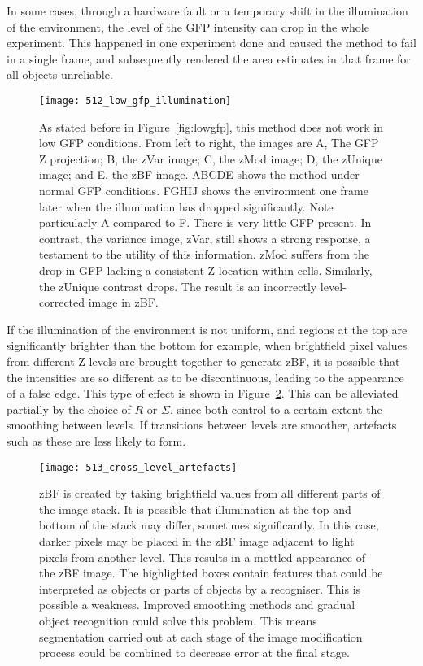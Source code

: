 In some cases, through a hardware fault or a temporary shift in the illumination of the environment, the level of the GFP intensity can drop in the whole experiment. This happened in one experiment done and caused the method to fail in a single frame, and subsequently rendered the area estimates in that frame for all objects unreliable.

\begin{figure}[h!]
 \centering
 \texttt{[image: 512\_low\_gfp\_illumination]}
 \caption[Effects of low GFP illumination]{
 	As stated before in Figure~\ref{fig:lowgfp}, this method does not work in low GFP conditions. From left to right, the images are A, The GFP Z projection; B, the zVar image; C, the zMod image; D, the zUnique image; and E, the zBF image. ABCDE shows the method under normal GFP conditions. FGHIJ shows the environment one frame later when the illumination has dropped significantly. Note particularly A compared to F. There is very little GFP present. In contrast, the variance image, zVar, still shows a strong response, a testament to the utility of this information. zMod suffers from the drop in GFP lacking a consistent Z location within cells. Similarly, the zUnique contrast drops. The result is an incorrectly level-corrected image in zBF.
 }
 \label{fig:lowgfpillumination}
\end{figure}

If the illumination of the environment is not uniform, and regions at the top are significantly brighter than the bottom for example, when brightfield pixel values from different Z levels are brought together to generate zBF, it is possible that the intensities are so different as to be discontinuous, leading to the appearance of a false edge. This type of effect is shown in Figure~\ref{fig:crosslevelartefacts}. This can be alleviated partially by the choice of $R$ or $\Sigma$, since both control to a certain extent the smoothing between levels. If transitions between levels are smoother, artefacts such as these are less likely to form.

\begin{figure}[h!]
 \centering
 \texttt{[image: 513\_cross\_level\_artefacts]}
 \caption[Cross-level artefacts]{
 	zBF is created by taking brightfield values from all different parts of the image stack. It is possible that illumination at the top and bottom of the stack may differ, sometimes significantly. In this case, darker pixels may be placed in the zBF image adjacent to light pixels from another level. This results in a mottled appearance of the zBF image. The highlighted boxes contain features that could be interpreted as objects or parts of objects by a recogniser. This is possible a weakness. Improved smoothing methods and gradual object recognition could solve this problem. This means segmentation carried out at each stage of the image modification process could be combined to decrease error at the final stage.
 }
 \label{fig:crosslevelartefacts}
\end{figure}

